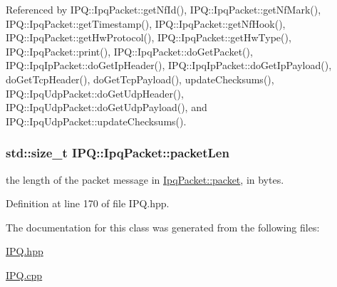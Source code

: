 \-Referenced by \-I\-P\-Q\-::\-Ipq\-Packet\-::get\-Nf\-Id(), \-I\-P\-Q\-::\-Ipq\-Packet\-::get\-Nf\-Mark(), \-I\-P\-Q\-::\-Ipq\-Packet\-::get\-Timestamp(), \-I\-P\-Q\-::\-Ipq\-Packet\-::get\-Nf\-Hook(), \-I\-P\-Q\-::\-Ipq\-Packet\-::get\-Hw\-Protocol(), \-I\-P\-Q\-::\-Ipq\-Packet\-::get\-Hw\-Type(), \-I\-P\-Q\-::\-Ipq\-Packet\-::print(), \-I\-P\-Q\-::\-Ipq\-Packet\-::do\-Get\-Packet(), \-I\-P\-Q\-::\-Ipq\-Ip\-Packet\-::do\-Get\-Ip\-Header(), \-I\-P\-Q\-::\-Ipq\-Ip\-Packet\-::do\-Get\-Ip\-Payload(), do\-Get\-Tcp\-Header(), do\-Get\-Tcp\-Payload(), update\-Checksums(), \-I\-P\-Q\-::\-Ipq\-Udp\-Packet\-::do\-Get\-Udp\-Header(), \-I\-P\-Q\-::\-Ipq\-Udp\-Packet\-::do\-Get\-Udp\-Payload(), and \-I\-P\-Q\-::\-Ipq\-Udp\-Packet\-::update\-Checksums().

\hypertarget{classIPQ_1_1IpqPacket_a9b448a070c5ae499e32d2af5a190b86d}{
\subsubsection[{packet\-Len}]{\setlength{\rightskip}{0pt plus 5cm}std\-::size\-\_\-t {\bf \-I\-P\-Q\-::\-Ipq\-Packet\-::packet\-Len}}}
\label{classIPQ_1_1IpqPacket_a9b448a070c5ae499e32d2af5a190b86d}


the length of the packet message in \hyperlink{classIPQ_1_1IpqPacket_a2bdf247f13a3e9f86e9e3846e6a9cb45}{\-Ipq\-Packet\-::packet}, in bytes. 



\-Definition at line 170 of file \-I\-P\-Q.\-hpp.



\-The documentation for this class was generated from the following files\-:\begin{DoxyCompactItemize}
\item 
\hyperlink{IPQ_8hpp}{\-I\-P\-Q.\-hpp}\item 
\hyperlink{IPQ_8cpp}{\-I\-P\-Q.\-cpp}\end{DoxyCompactItemize}
